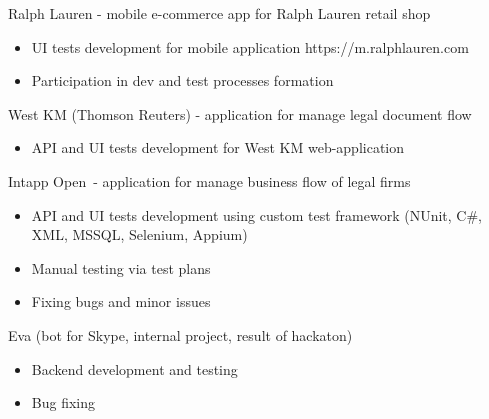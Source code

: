 \documentclass{resume}
\begin{document}
 {}
Ralph Lauren - mobile e-commerce app for Ralph Lauren retail shop
\begin{itemize}
  \item UI tests development for mobile application https://m.ralphlauren.com
  \item Participation in dev and test processes formation
\end{itemize}
West KM (Thomson Reuters) - application for manage legal document flow
\begin{itemize}
  \item API and UI tests development for West KM web-application
\end{itemize}

 {}
Intapp Open - application for manage business flow of legal firms
\begin{itemize}
  \item API and UI tests development using custom test framework (NUnit, C\#, XML, MSSQL, Selenium, Appium)
  \item Manual testing via test plans
  \item Fixing bugs and minor issues
\end{itemize}
Eva (bot for Skype, internal project, result of hackaton) 
\begin{itemize}
  \item Backend development and testing
  \item Bug fixing
\end{itemize}

\end{document}

